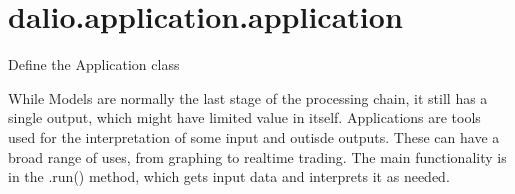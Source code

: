 \documentclass[letterpaper,10pt,english]{sphinxmanual}
\begin{document}
\section{dalio.application.application}
\label{\detokenize{dalio.application:module-dalio.application.application}}\label{\detokenize{dalio.application:dalio-application-application}}
Define the Application class

While Models are normally the last stage of the processing chain, it
still has a single output, which might have limited value in itself.
Applications are tools used for the interpretation of some input and
outisde outputs. These can have a broad range of uses, from graphing to
real\sphinxhyphen{}time trading. The main functionality is in the .run() method, which
gets input data and interprets it as needed.
\end{document}
